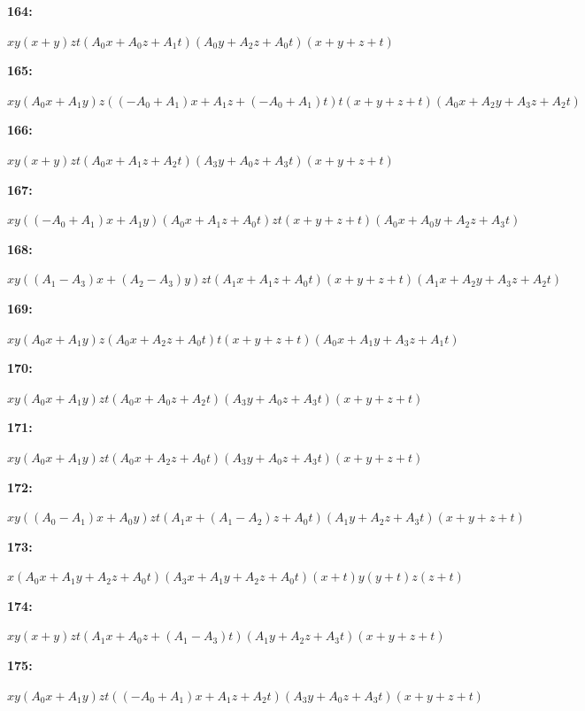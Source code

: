 \documentclass[12pt]{amsart}
\theoremstyle{plain}
\theoremstyle{remark}
\theoremstyle{definition}
\numberwithin{table}{section}
\begin{document}
\noindent\parbox[right]{9mm}{\textbf{164:}}\parbox{3mm}{\hfill}%
\parbox[t]{15cm}{\(xy(x + y)zt(A_{0}x + A_{0}z + A_{1}t)(A_{0}y + A_{2}z + A_{0}t)(x + y + z + t)\)}

\noindent\parbox[right]{9mm}{\textbf{165:}}\parbox{3mm}{\hfill}%
\parbox[t]{15cm}{\(xy(A_{0}x + A_{1}y)z((-A_{0} + A_{1})x + A_{1}z + (-A_{0} + A_{1})t)t(x + y + z + t)(A_{0}x + A_{2}y + A_{3}z + A_{2}t)\)}

\noindent\parbox[right]{9mm}{\textbf{166:}}\parbox{3mm}{\hfill}%
\parbox[t]{15cm}{\(xy(x + y)zt(A_{0}x + A_{1}z + A_{2}t)(A_{3}y + A_{0}z + A_{3}t)(x + y + z + t)\)}

\noindent\parbox[right]{9mm}{\textbf{167:}}\parbox{3mm}{\hfill}%
\parbox[t]{15cm}{\(xy((-A_{0} + A_{1})x + A_{1}y)(A_{0}x + A_{1}z + A_{0}t)zt(x + y + z + t)(A_{0}x + A_{0}y + A_{2}z + A_{3}t)\)}

\noindent\parbox[right]{9mm}{\textbf{168:}}\parbox{3mm}{\hfill}%
\parbox[t]{15cm}{\(xy((A_{1} - A_{3})x + (A_{2} - A_{3})y)zt(A_{1}x + A_{1}z + A_{0}t)(x + y + z + t)(A_{1}x + A_{2}y + A_{3}z + A_{2}t)\)}

\noindent\parbox[right]{9mm}{\textbf{169:}}\parbox{3mm}{\hfill}%
\parbox[t]{15cm}{\(xy(A_{0}x + A_{1}y)z(A_{0}x + A_{2}z + A_{0}t)t(x + y + z + t)(A_{0}x + A_{1}y + A_{3}z + A_{1}t)\)}

\noindent\parbox[right]{9mm}{\textbf{170:}}\parbox{3mm}{\hfill}%
\parbox[t]{15cm}{\(xy(A_{0}x + A_{1}y)zt(A_{0}x + A_{0}z + A_{2}t)(A_{3}y + A_{0}z + A_{3}t)(x + y + z + t)\)}

\noindent\parbox[right]{9mm}{\textbf{171:}}\parbox{3mm}{\hfill}%
\parbox[t]{15cm}{\(xy(A_{0}x + A_{1}y)zt(A_{0}x + A_{2}z + A_{0}t)(A_{3}y + A_{0}z + A_{3}t)(x + y + z + t)\)}

\noindent\parbox[right]{9mm}{\textbf{172:}}\parbox{3mm}{\hfill}%
\parbox[t]{15cm}{\(xy((A_{0} - A_{1})x + A_{0}y)zt(A_{1}x + (A_{1} - A_{2})z + A_{0}t)(A_{1}y + A_{2}z + A_{3}t)(x + y + z + t)\)}

\noindent\parbox[right]{9mm}{\textbf{173:}}\parbox{3mm}{\hfill}%
\parbox[t]{15cm}{\(x(A_{0}x + A_{1}y + A_{2}z + A_{0}t)(A_{3}x + A_{1}y + A_{2}z + A_{0}t)(x + t)y(y + t)z(z + t)\)}

\noindent\parbox[right]{9mm}{\textbf{174:}}\parbox{3mm}{\hfill}%
\parbox[t]{15cm}{\(xy(x + y)zt(A_{1}x + A_{0}z + (A_{1} - A_{3})t)(A_{1}y + A_{2}z + A_{3}t)(x + y + z + t)\)}

\noindent\parbox[right]{9mm}{\textbf{175:}}\parbox{3mm}{\hfill}%
\parbox[t]{15cm}{\(xy(A_{0}x + A_{1}y)zt((-A_{0} + A_{1})x + A_{1}z + A_{2}t)(A_{3}y + A_{0}z + A_{3}t)(x + y + z + t)\)}
\end{document}
